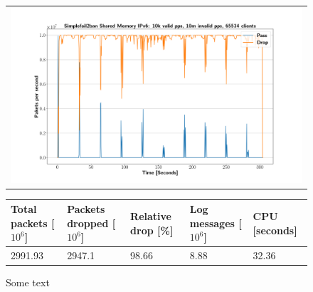 \begin{figure}[p]
	\label{fig:simplefail2ban:shm:ip6:10m}
	\centering
	\scriptsize
	\begin{tabular}{c}
    	\centerline{\includegraphics[width=1.2\textwidth]{images/simplefail2ban_shm_ipv6_v10k_iv10m_c65534.png}}
	\end{tabular}
	\begin{tabular}{lllll}
		\toprule
		\textbf{Total packets [$10^6$]} & \textbf{Packets dropped [$10^6$]} & \textbf{Relative drop [\%]} & \textbf{Log messages [$10^6$]} & \textbf{CPU [seconds]} \\ \midrule 
		2991.93 & 2947.1 & 98.66 & 8.88 & 32.36 \\
		\bottomrule
	\end{tabular}
	\caption[Simplefail2ban Shared Memory IPv6 10m PPS]{Some text}
\end{figure}

